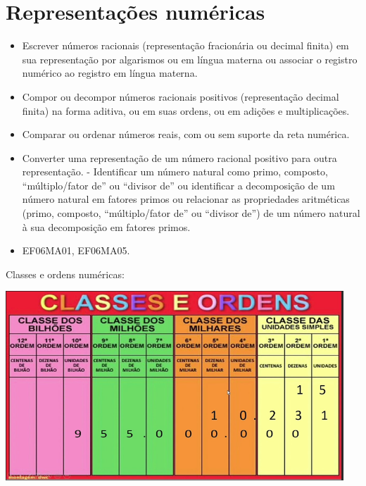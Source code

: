 \chapter{Representações numéricas}


\begin{itemize}
\item
  Escrever números racionais (representação fracionária ou decimal
  finita) em sua representação por algarismos ou em língua materna ou
  associar o registro numérico ao registro em língua materna.
\item
  Compor ou decompor números racionais positivos (representação decimal
  finita) na forma aditiva, ou em suas ordens, ou em adições e
  multiplicações.
\item
  Comparar ou ordenar números reais, com ou sem suporte da reta
  numérica.
\item
  Converter uma representação de um número racional positivo para outra
  representação. - Identificar um número natural como primo, composto,
  ``múltiplo/fator de'' ou ``divisor de'' ou identificar a decomposição
  de um número natural em fatores primos ou relacionar as propriedades
  aritméticas (primo, composto, ``múltiplo/fator de'' ou ``divisor de'')
  de um número natural à sua decomposição em fatores primos.
\end{itemize}


\begin{itemize} 
\item  EF06MA01, EF06MA05.
\end{itemize}

Classes e ordens numéricas:


\includegraphics[width=5in,height=2.80208in]{./imgSAEB_6_MAT/media/image1.png}

